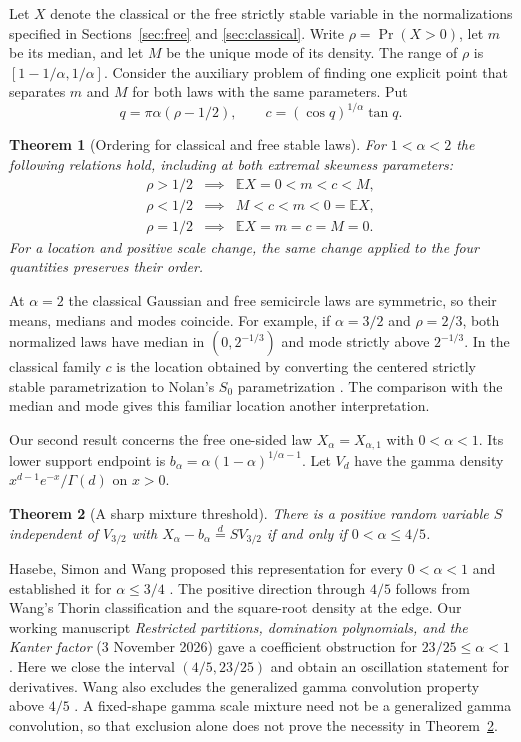 \documentclass[11pt,a4paper]{article}
\newtheorem{theorem}{Theorem}[section]
\numberwithin{equation}{section}
\begin{document}
Let $X$ denote the classical or the free strictly stable variable in
the normalizations specified in Sections~\ref{sec:free} and
\ref{sec:classical}. Write $\rho=\Pr(X>0)$, let $m$ be its median, and
let $M$ be the unique mode of its density. The range of $\rho$ is
$[1-1/\alpha,1/\alpha]$. Consider the auxiliary problem of finding
one explicit point that separates $m$ and $M$ for both laws with the
same parameters. Put
\begin{equation}\label{eq:separator}
 q=\pi\alpha(\rho-1/2),\qquad
 c=(\cos q)^{1/\alpha}\tan q .
\end{equation}
\begin{theorem}[Ordering for classical and free stable laws]\label{thm:order}
For $1<\alpha<2$ the following relations hold, including at both
extremal skewness parameters:
\[
\begin{array}{ccl}
\rho>1/2 &\implies& \mathbb E X=0<m<c<M,\\
\rho<1/2 &\implies& M<c<m<0=\mathbb E X,\\
\rho=1/2 &\implies& \mathbb E X=m=c=M=0 .
\end{array}
\]
For a location and positive scale change, the same change applied to
the four quantities preserves their order.
\end{theorem}
At $\alpha=2$ the classical Gaussian and free semicircle laws are symmetric,
so their means, medians and modes coincide.
For example, if $\alpha=3/2$ and $\rho=2/3$, both normalized laws have
median in $(0,2^{-1/3})$ and mode strictly above $2^{-1/3}$.
In the classical family $c$ is the location obtained by converting
the centered strictly stable parametrization to Nolan's $S_0$
parametrization \cite[Chapter~1, \S1.3]{Nolan}. The comparison with
the median and mode gives this familiar location another interpretation.

Our second result concerns the free one-sided law $X_\alpha=X_{\alpha,1}$
with $0<\alpha<1$. Its lower support endpoint is
$b_\alpha=\alpha(1-\alpha)^{1/\alpha-1}$. Let $V_d$ have the gamma
density $x^{d-1}e^{-x}/\Gamma(d)$ on $x>0$.
\begin{theorem}[A sharp mixture threshold]\label{thm:mixture}
There is a positive random variable $S$ independent of $V_{3/2}$ with
$X_\alpha-b_\alpha\stackrel{d}{=}S V_{3/2}$ if and only if
$0<\alpha\le4/5$.
\end{theorem}
Hasebe, Simon and Wang proposed this representation for every
$0<\alpha<1$ and established it for $\alpha\le3/4$
\cite[Remarks~2(b) and 10(b)]{HSW}. The positive direction through
$4/5$ follows from Wang's Thorin classification \cite[Theorem~C.4]{MW}
and the square-root density at the edge. Our working manuscript \emph{Restricted partitions, domination polynomials,
and the Kanter factor} (3 November 2026) gave a coefficient obstruction for
$23/25\le\alpha<1$. Here we close the interval $(4/5,23/25)$ and
obtain an oscillation statement for derivatives. Wang also excludes
the generalized gamma convolution property above $4/5$
\cite[Theorem~A.3]{MW}. A fixed-shape gamma scale mixture need not
be a generalized gamma convolution, so that exclusion alone does not
prove the necessity in Theorem~\ref{thm:mixture}.
\end{document}
